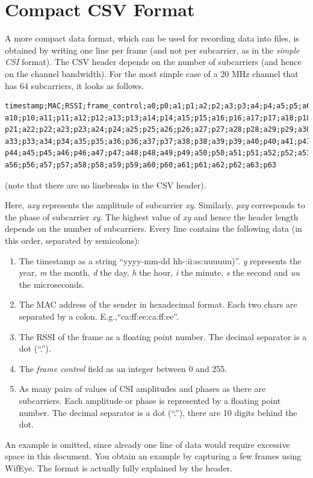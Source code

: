 \documentclass{article}
\begin{document}
\section{Compact CSV Format}
A more compact data format, which can be used for recording data into files, is obtained by writing one line per frame (and not per subcarrier, as in the \textit{simple CSI} format).
The CSV header depends on the number of subcarriers (and hence on the channel bandwidth). For the most simple case of a 20 MHz channel that has 64 subcarriers, it looks as follows.
\begin{Verbatim}[fontsize=\small]
timestamp;MAC;RSSI;frame_control;a0;p0;a1;p1;a2;p2;a3;p3;a4;p4;a5;p5;a6;p6;a7;p7;a8;p8;a9;p9;
a10;p10;a11;p11;a12;p12;a13;p13;a14;p14;a15;p15;a16;p16;a17;p17;a18;p18;a19;p19;a20;p20;a21;
p21;a22;p22;a23;p23;a24;p24;a25;p25;a26;p26;a27;p27;a28;p28;a29;p29;a30;p30;a31;p31;a32;p32;
a33;p33;a34;p34;a35;p35;a36;p36;a37;p37;a38;p38;a39;p39;a40;p40;a41;p41;a42;p42;a43;p43;a44;
p44;a45;p45;a46;p46;a47;p47;a48;p48;a49;p49;a50;p50;a51;p51;a52;p52;a53;p53;a54;p54;a55;p55;
a56;p56;a57;p57;a58;p58;a59;p59;a60;p60;a61;p61;a62;p62;a63;p63
\end{Verbatim}
(note that there are no linebreaks in the CSV header).

Here, \textit{axy} represents the amplitude of subcarrier \textit{xy}. Similarly, \textit{pxy} corresponds to the phase of subcarrier \textit{xy}. The highest value of \textit{xy} and hence the header length depends on the 
number of subcarriers.
Every line contains the following data (in this order, separated by semicolons):
\begin{enumerate}
	\item The timestamp as a string ``yyyy-mm-dd hh-:ii:ss:uuuuuu)''. \textit{y} represents the year, \textit{m} the month, \textit{d} the day, \textit{h} the hour, \textit{i} the minute, \textit{s} the second and \textit{uu} the microseconds.
	\item The MAC address of the sender in hexadecimal format. Each two chars are separated by a colon. E.g.,``ca:ff:ee:ca:ff:ee''.
	\item The RSSI of the frame as a floating point number. The decimal separator is a dot (``.'').
	\item The \textit{frame control} field as an integer between 0 and 255.
	\item As many pairs of values of CSI amplitudes and phases as there are subcarriers.  Each amplitude or phase is represented by a floating point number. The decimal separator is a dot (``.''), there are 10 digits behind the dot.
\end{enumerate}
An example is omitted, since already one line of data would require excessive space in this document. You obtain an example by capturing a few frames using WifEye. The format is actually fully explained by the header.
\end{document}
